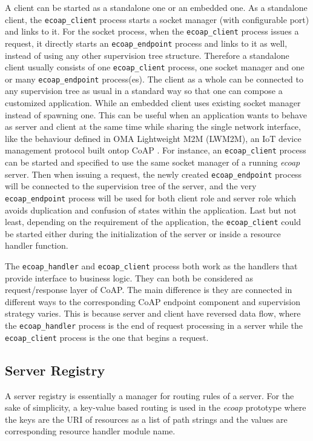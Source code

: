 A client can be started as a standalone one or an embedded one. As a standalone client, the \verb|ecoap_client| process starts a socket manager (with configurable port) and links to it. For the socket process, when the \verb|ecoap_client| process issues a request, it directly starts an \verb|ecoap_endpoint| process and links to it as well, instead of using any other supervision tree structure. Therefore a standalone client usually consists of one \verb|ecoap_client| process, one socket manager and one or many \verb|ecoap_endpoint| process(es). The client as a whole can be connected to any supervision tree as usual in a standard way so that one can compose a customized application. While an embedded client uses existing socket manager instead of spawning one. This can be useful when an application wants to behave as server and client at the same time while sharing the single network interface, like the behaviour defined in OMA Lightweight M2M (LWM2M), an IoT device management protocol built ontop CoAP \cite{}. For instance, an \verb|ecoap_client| process can be started and specified to use the same socket manager of a running \textit{ecoap} server. Then when issuing a request, the newly created \verb|ecoap_endpoint| process will be connected to the supervision tree of the server, and the very \verb|ecoap_endpoint| process will be used for both client role and server role which avoids duplication and confusion of states within the application. Last but not least, depending on the requirement of the application, the \verb|ecoap_client| could be started either during the initialization of the server or inside a resource handler function.

The \verb|ecoap_handler| and \verb|ecoap_client| process both work as the handlers that provide interface to business logic. They can both be considered as request/response layer of CoAP. The main difference is they are connected in different ways to the corresponding CoAP endpoint component and supervision strategy varies. This is because server and client have reversed data flow, where the \verb|ecoap_handler| process is the end of request processing in a server while the \verb|ecoap_client| process is the one that begins a request.

\subsection{Server Registry}\label{coap_registry}

A server registry is essentially a manager for routing rules of a server. For the sake of simplicity, a key-value based routing is used in the \textit{ecoap} prototype where the keys are the URI of resources as a list of path strings and the values are corresponding resource handler module name. 

